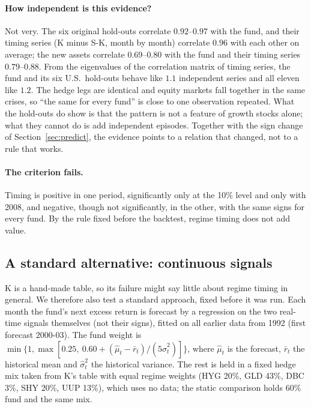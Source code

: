 \documentclass[11pt,a4paper]{article}
\begin{document}
\paragraph{How independent is this evidence?} Not very. The six original hold-outs correlate $0.92$--$0.97$ with the
fund, and their timing series (K minus S-K, month by month) correlate $0.96$ with each other on average; the
new assets correlate $0.69$--$0.80$ with the fund and their timing series $0.79$--$0.88$. From the eigenvalues of the
correlation matrix of timing series, the fund and its six U.S.\ hold-outs behave like $1.1$ independent series and all
eleven like $1.2$. The hedge legs are identical and equity markets fall together in the same crises, so ``the
same for every fund'' is close to one observation repeated. What the hold-outs do show is that the pattern is
not a feature of growth stocks alone; what they cannot do is add independent episodes. Together with the sign
change of Section~\ref{sec:predict}, the evidence points to a relation that changed, not to a rule that works.

\paragraph{The criterion fails.} Timing is positive in one period, significantly only at the 10\% level and only
with 2008, and negative, though not significantly, in the other, with the same signs for every fund. By the rule fixed before the backtest, regime timing does not add value.

\subsection{A standard alternative: continuous signals}
\label{sec:model}

K is a hand-made table, so its failure might say little about regime timing in general. We therefore also test a
standard approach, fixed before it was run. Each month the fund's next excess return is forecast by a regression on
the two real-time signals themselves (not their signs), fitted on all earlier data from 1992 (first forecast
2000-03). The fund weight is $\min\{1,\max[0.25,\ 0.60 + (\hat\mu_t - \bar r_t)/(5\hat\sigma_t^2)]\}$, where $\hat\mu_t$ is
the forecast, $\bar r_t$ the historical mean and $\hat\sigma^2_t$ the historical variance. The rest is held in a fixed
hedge mix taken from K's table with equal regime weights (HYG 20\%, GLD 43\%, DBC 3\%, SHY 20\%, UUP 13\%), which uses no data; the static comparison
holds 60\% fund and the same mix.
\end{document}
